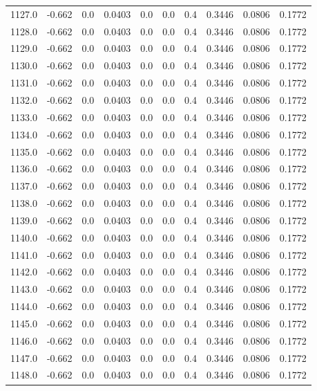 \begin{longtable}{lrrrrrrrrr}
1127.0 & -0.662 & 0.0 & 0.0403 & 0.0 & 0.0 & 0.4 & 0.3446 & 0.0806 & 0.1772 \\
1128.0 & -0.662 & 0.0 & 0.0403 & 0.0 & 0.0 & 0.4 & 0.3446 & 0.0806 & 0.1772 \\
1129.0 & -0.662 & 0.0 & 0.0403 & 0.0 & 0.0 & 0.4 & 0.3446 & 0.0806 & 0.1772 \\
1130.0 & -0.662 & 0.0 & 0.0403 & 0.0 & 0.0 & 0.4 & 0.3446 & 0.0806 & 0.1772 \\
1131.0 & -0.662 & 0.0 & 0.0403 & 0.0 & 0.0 & 0.4 & 0.3446 & 0.0806 & 0.1772 \\
1132.0 & -0.662 & 0.0 & 0.0403 & 0.0 & 0.0 & 0.4 & 0.3446 & 0.0806 & 0.1772 \\
1133.0 & -0.662 & 0.0 & 0.0403 & 0.0 & 0.0 & 0.4 & 0.3446 & 0.0806 & 0.1772 \\
1134.0 & -0.662 & 0.0 & 0.0403 & 0.0 & 0.0 & 0.4 & 0.3446 & 0.0806 & 0.1772 \\
1135.0 & -0.662 & 0.0 & 0.0403 & 0.0 & 0.0 & 0.4 & 0.3446 & 0.0806 & 0.1772 \\
1136.0 & -0.662 & 0.0 & 0.0403 & 0.0 & 0.0 & 0.4 & 0.3446 & 0.0806 & 0.1772 \\
1137.0 & -0.662 & 0.0 & 0.0403 & 0.0 & 0.0 & 0.4 & 0.3446 & 0.0806 & 0.1772 \\
1138.0 & -0.662 & 0.0 & 0.0403 & 0.0 & 0.0 & 0.4 & 0.3446 & 0.0806 & 0.1772 \\
1139.0 & -0.662 & 0.0 & 0.0403 & 0.0 & 0.0 & 0.4 & 0.3446 & 0.0806 & 0.1772 \\
1140.0 & -0.662 & 0.0 & 0.0403 & 0.0 & 0.0 & 0.4 & 0.3446 & 0.0806 & 0.1772 \\
1141.0 & -0.662 & 0.0 & 0.0403 & 0.0 & 0.0 & 0.4 & 0.3446 & 0.0806 & 0.1772 \\
1142.0 & -0.662 & 0.0 & 0.0403 & 0.0 & 0.0 & 0.4 & 0.3446 & 0.0806 & 0.1772 \\
1143.0 & -0.662 & 0.0 & 0.0403 & 0.0 & 0.0 & 0.4 & 0.3446 & 0.0806 & 0.1772 \\
1144.0 & -0.662 & 0.0 & 0.0403 & 0.0 & 0.0 & 0.4 & 0.3446 & 0.0806 & 0.1772 \\
1145.0 & -0.662 & 0.0 & 0.0403 & 0.0 & 0.0 & 0.4 & 0.3446 & 0.0806 & 0.1772 \\
1146.0 & -0.662 & 0.0 & 0.0403 & 0.0 & 0.0 & 0.4 & 0.3446 & 0.0806 & 0.1772 \\
1147.0 & -0.662 & 0.0 & 0.0403 & 0.0 & 0.0 & 0.4 & 0.3446 & 0.0806 & 0.1772 \\
1148.0 & -0.662 & 0.0 & 0.0403 & 0.0 & 0.0 & 0.4 & 0.3446 & 0.0806 & 0.1772 \\

\end{longtable}

